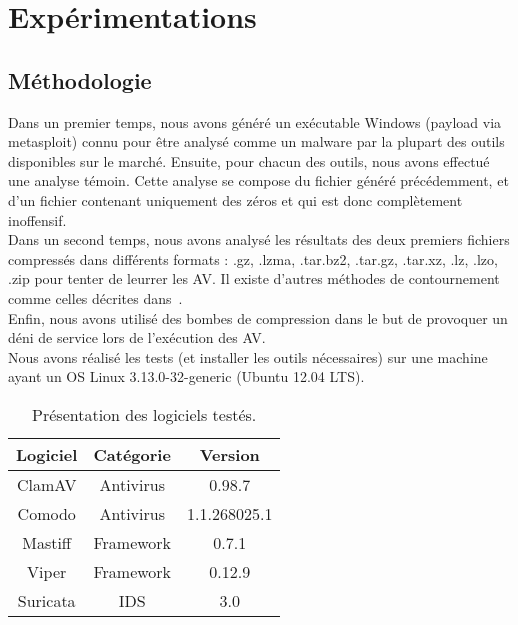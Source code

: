 \documentclass{svjour3}
\begin{document}
\section{Expérimentations}
\label{3.expérimentations}

\subsection{Méthodologie}
\label{3.1méthodologie}
Dans un premier temps, nous avons généré un exécutable Windows (payload via metasploit) connu pour être analysé comme un malware par la plupart des outils disponibles sur le marché. Ensuite, pour chacun des outils, nous avons effectué une analyse témoin. Cette analyse se compose du fichier généré précédemment, et d'un fichier contenant uniquement des zéros et qui est donc complètement inoffensif.\\
Dans un second temps, nous avons analysé les résultats des deux premiers fichiers compressés dans différents formats : .gz, .lzma, .tar.bz2, .tar.gz, .tar.xz, .lz, .lzo, .zip pour tenter de leurrer les AV. Il existe d'autres méthodes de contournement comme celles décrites dans~\cite{Contournement}.\\
Enfin, nous avons utilisé des bombes de compression dans le but de provoquer un déni de service lors de l'exécution des AV.\\
$ $\\
Nous avons réalisé les tests (et installer les outils nécessaires) sur une machine ayant un OS Linux 3.13.0-32-generic (Ubuntu 12.04 LTS).
\begin{table}[ht!]
	\begin{center}
		\begin{normalsize}
			\begin{tabular}{|c|c|c|}
    				\hline
     			\textbf{Logiciel} & \textbf{Catégorie} & \textbf{Version}\\
    				\hline
    				ClamAV & Antivirus & 0.98.7\\ 			
    				\hline
    				Comodo & Antivirus & 1.1.268025.1\\
    				\hline
    				\hline
    				Mastiff & Framework & 0.7.1\\
    				\hline
    				Viper & Framework & 0.12.9\\
    				\hline
    				\hline
    				Suricata & IDS & 3.0\\
    				\hline
 			\end{tabular}
 		\end{normalsize}
	\end{center}
	\caption{Présentation des logiciels testés.}
\end{table}
\end{document}
